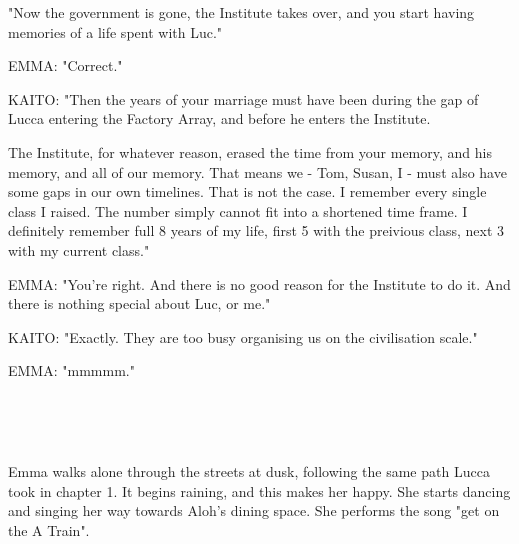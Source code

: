 \documentclass[11pt]{article}
\begin{document}
"Now the government is gone, the Institute takes over, and you start having memories of a life spent with Luc."

EMMA: "Correct."

KAITO: "Then the years of your marriage must have been during the gap of Lucca entering the Factory Array, and before he enters the Institute.

The Institute, for whatever reason, erased the time from your memory, and his memory, and all of our memory. 
That means we - Tom, Susan, I - must also have some gaps in our own timelines.
That is not the case.
I remember every single class I raised. 
The number simply cannot fit into a shortened time frame. 
I definitely remember full 8 years of my life, first 5 with the preivious class, next 3 with my current class."

EMMA: "You're right.
And there is no good reason for the Institute to do it. 
And there is nothing special about Luc, or me."

KAITO: "Exactly. They are too busy organising us on the civilisation scale."

EMMA: "mmmmm."

\ 

\ 

Emma walks alone through the streets at dusk, following the same path Lucca took in chapter 1.
It begins raining, and this makes her happy. 
She starts dancing and singing her way towards Aloh's dining space.
She performs the song "get on the A Train".
\end{document}
